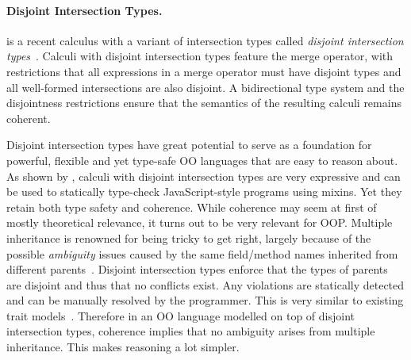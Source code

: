 \paragraph{Disjoint Intersection Types.}
\oname is a recent calculus with a variant of intersection types 
called \emph{disjoint intersection types}~\citep{oliveira2016disjoint}.
Calculi with disjoint intersection types feature the merge 
operator, with restrictions that all expressions in a merge 
operator must have disjoint types and all well-formed intersections 
are also disjoint. A bidirectional type system and the disjointness restrictions 
ensure that the semantics of the resulting calculi remains 
coherent. 

\begin{comment}
The merge operator was introduced by Reynolds 
and Forsythe and adopted by a few other calculi as well~\citep{}.
Unfortunately, while the merge operator is powerful, it makes 
it hard to get a \emph{coherent} semantics. \bruno{what is coherence}
Perhaps because 
of this issue the merge operator has not been adopted by 
many language designs. Disjoint intersection types provide 
a remedy for the coherence problem, by imposing restrictions 
on the uses of merges and on the formation of intersection types. 
\bruno{merge operator ==> models inheritance; intersection types ==> 
model subtyping}

In essence disjoint intersection types retain most of the 
expressive power of the merge operator.
For example, they can 
be used to model powerful forms of extensible records~\citep{}.
\end{comment}

Disjoint intersection types have great potential to serve as a foundation for
powerful, flexible and yet type-safe OO languages that are easy to reason
about. As shown by \citet{alpuimdisjoint}, calculi with disjoint intersection
types are very
expressive and can be used to statically type-check JavaScript-style programs
using mixins. Yet they retain both type safety and coherence. While
coherence may seem at first of mostly theoretical relevance, it
turns out to be very relevant for OOP. Multiple
inheritance is renowned for being tricky to get right, largely because of the
possible \emph{ambiguity} issues caused by the same field/method names
inherited from different parents~\citep{bracha1990mixin, scharli2003traits}. Disjoint intersection types
enforce that the types of parents are disjoint and thus that no conflicts exist.
Any violations are statically detected and can be manually resolved by the
programmer.
This is very similar to existing trait models~\citep{scharli2003traits, Ducasse_2006}. Therefore in an OO language
modelled on top of disjoint intersection types, coherence implies
that no ambiguity arises from multiple inheritance. This makes
reasoning a lot simpler.

